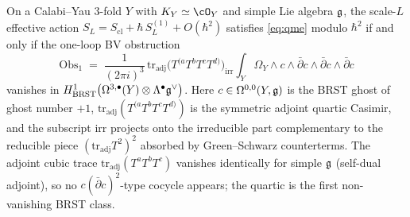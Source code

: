 \begin{proposition}
\label{prop:hcs-one-loop-anomaly}
\ClaimStatusProvedElsewhere
On a Calabi--Yau $3$-fold $Y$ with $K_{Y}\simeq\cO_{Y}$ and simple Lie
algebra $\mathfrak{g}$, the scale-$L$ effective action
$S_{L} = S_{\mathrm{cl}} + \hbar\,S^{(1)}_{L} + O(\hbar^{2})$
satisfies \eqref{eq:qme} modulo $\hbar^{2}$ if and only if the one-loop
BV obstruction
\begin{equation}\label{eq:one-loop-anomaly}
 \mathrm{Obs}_{1}
 \;=\;
 \frac{1}{(2\pi i)^{3}}\,
 \mathrm{tr}_{\mathrm{adj}}\!\bigl(T^{(a}T^{b}T^{c}T^{d)}\bigr)_{\mathrm{irr}}
 \int_{Y}\Omega_{Y}\wedge
 c\wedge\bar\partial c\wedge\bar\partial c\wedge\bar\partial c
\end{equation}
vanishes in $H^{1}_{\mathrm{BRST}}\bigl(\Omega^{3,\bullet}(Y)\otimes
\Lambda^{\bullet}\mathfrak{g}^{\vee}\bigr)$. Here $c\in\Omega^{0,0}(Y,\mathfrak{g})$ is
the BRST ghost of ghost number $+1$,
$\mathrm{tr}_{\mathrm{adj}}(T^{(a}T^{b}T^{c}T^{d)})$ is the symmetric
adjoint quartic Casimir, and the subscript $\mathrm{irr}$ projects onto
the irreducible part complementary to the reducible piece
$(\mathrm{tr}_{\mathrm{adj}}T^{2})^{2}$ absorbed by Green--Schwarz
counterterms. The adjoint cubic trace
$\mathrm{tr}_{\mathrm{adj}}(T^{a}T^{b}T^{c})$ vanishes identically for
simple $\mathfrak{g}$ (self-dual adjoint), so no $c(\bar\partial c)^{2}$-type
cocycle appears; the quartic is the first non-vanishing BRST class.
\end{proposition}

